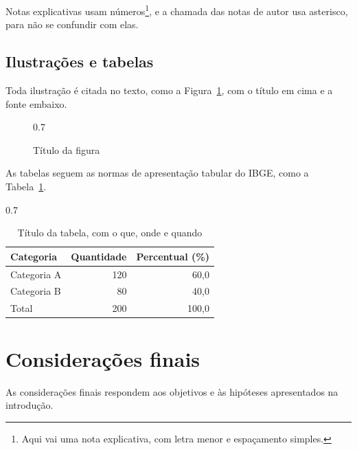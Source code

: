 \documentclass[12pt,a4paper,oneside]{article}
\begin{document}
Notas explicativas usam números\footnote{Aqui vai uma nota explicativa, com letra menor e espaçamento simples.}, e a chamada das notas de autor usa asterisco, para não se confundir com elas.

\subsection{Ilustrações e tabelas}

Toda ilustração é citada no texto, como a Figura~\ref{fig:exemplo}, com o título em cima e a fonte embaixo.

\begin{figure}[htbp]
  \begin{ilustracao}{0.7\textwidth}
    \caption{Título da figura}\label{fig:exemplo}
  \end{ilustracao}
\end{figure}

As tabelas seguem as normas de apresentação tabular do IBGE, como a Tabela~\ref{tab:exemplo}.

\begin{table}[htbp]
  \begin{ilustracao}{0.7\textwidth}
    \caption{Título da tabela, com o que, onde e quando}\label{tab:exemplo}
    \centering
    \begin{tabular*}{\linewidth}{@{\extracolsep{\fill}}lrr}
      \toprule
      Categoria & Quantidade & Percentual (\%) \\
      \midrule
      Categoria A & 120 & 60,0 \\
      Categoria B & 80 & 40,0 \\
      \midrule
      Total & 200 & 100,0 \\
      \bottomrule
    \end{tabular*}
  \end{ilustracao}
\end{table}

\section{Considerações finais}

As considerações finais respondem aos objetivos e às hipóteses apresentados na introdução.
\end{document}
